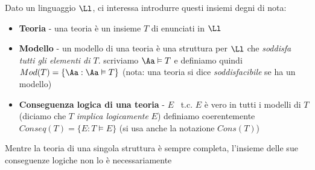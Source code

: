 \documentclass[a4paper,11pt]{report}
\begin{document}
Dato un linguaggio \( \Ll \), ci interessa introdurre questi insiemi degni di nota:
\begin{itemize}
    \item \textbf{Teoria} - una teoria è un insieme \( T \) di enunciati in \( \Ll \)
    \item \textbf{Modello} - un modello di una teoria è una struttura per \( \Ll \) che \textit{soddisfa tutti gli elementi di \( T \)}.
        \subitem scriviamo \( \Aa \vDash T \)
        \subitem e definiamo quindi \( Mod(T)=\{\Aa : \Aa \vDash T\} \)
        \subitem (nota: una teoria si dice \textit{soddisfacibile} se ha un modello)
    \item \textbf{Conseguenza logica di una teoria} - \( E \) \ t.c. \(E \) è vero in tutti i modelli di \( T \) (diciamo che \( T \) \textit{implica logicamente} \( E \))
        \subitem definiamo coerentemente \( Conseq(T) = \{E : T\vDash E\} \) (si usa anche la notazione \( Cons(T) \))
\end{itemize}

Mentre la teoria di una singola struttura è sempre completa, l'insieme delle sue conseguenze logiche non lo è necessariamente
\end{document}
